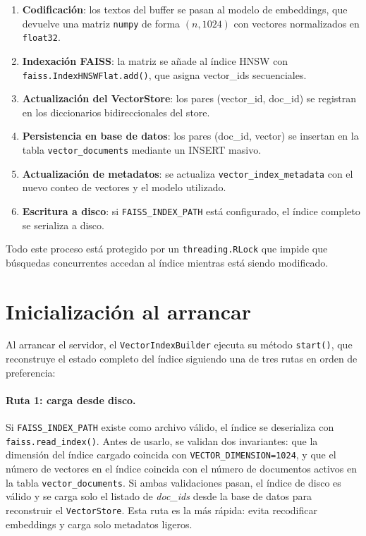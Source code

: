 \documentclass[11pt]{article}
\begin{document}
\begin{enumerate}
\item \textbf{Codificación}: los textos del buffer se pasan al modelo de embeddings, que
      devuelve una matriz \texttt{numpy} de forma $(n, 1024)$ con vectores normalizados en
      \texttt{float32}.
\item \textbf{Indexación FAISS}: la matriz se añade al índice HNSW con
      \texttt{faiss.IndexHNSWFlat.add()}, que asigna vector\_ids secuenciales.
\item \textbf{Actualización del VectorStore}: los pares (vector\_id, doc\_id) se registran
      en los diccionarios bidireccionales del store.
\item \textbf{Persistencia en base de datos}: los pares (doc\_id, vector) se insertan en la
      tabla \texttt{vector\_documents} mediante un INSERT masivo.
\item \textbf{Actualización de metadatos}: se actualiza \texttt{vector\_index\_metadata} con
      el nuevo conteo de vectores y el modelo utilizado.
\item \textbf{Escritura a disco}: si \texttt{FAISS\_INDEX\_PATH} está configurado, el índice
      completo se serializa a disco.
\end{enumerate}

Todo este proceso está protegido por un \texttt{threading.RLock} que impide que búsquedas
concurrentes accedan al índice mientras está siendo modificado.

\section{Inicialización al arrancar}

Al arrancar el servidor, el \texttt{VectorIndexBuilder} ejecuta su método \texttt{start()},
que reconstruye el estado completo del índice siguiendo una de tres rutas en orden de
preferencia:

\paragraph{Ruta 1: carga desde disco.}
Si \texttt{FAISS\_INDEX\_PATH} existe como archivo válido, el índice se deserializa con
\texttt{faiss.read\_index()}. Antes de usarlo, se validan dos invariantes: que la dimensión
del índice cargado coincida con \texttt{VECTOR\_DIMENSION=1024}, y que el número de vectores
en el índice coincida con el número de documentos activos en la tabla
\texttt{vector\_documents}. Si ambas validaciones pasan, el índice de disco es válido y se
carga solo el listado de \emph{doc\_ids} desde la base de datos para reconstruir el
\texttt{VectorStore}. Esta ruta es la más rápida: evita recodificar embeddings y carga solo
metadatos ligeros.
\end{document}
